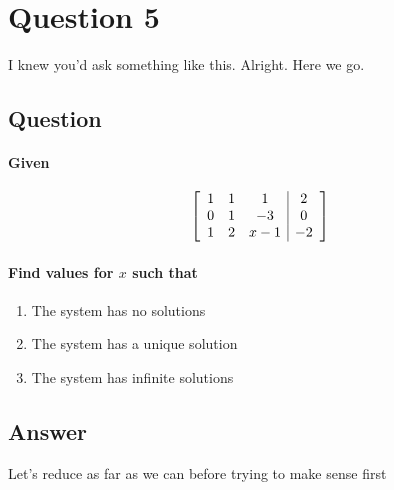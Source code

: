 \documentclass{article}
\begin{document}
    \section{Question 5}
        I knew you'd ask something like this.
        Alright. Here we go.
        \subsection{Question}
                \paragraph{Given}
                    \[
                    \begin{bmatrix}
                    \begin{array}{{ccc|c}}

                            1 & 1 &   1 &  2\\
                            0 & 1 &  -3 &  0\\
                            1 & 2 & x-1 & -2
                    \end{array}
                    \end{bmatrix}
                    \]
                \paragraph{Find values for $x$ such that}
                    \begin{enumerate}[label=(\Roman*)]
                        \item The system has no solutions
                        \item The system has a unique solution
                        \item The system has infinite solutions
                    \end{enumerate}
        \subsection{Answer}
            Let's reduce as far as we can before trying to make sense first
\end{document}
